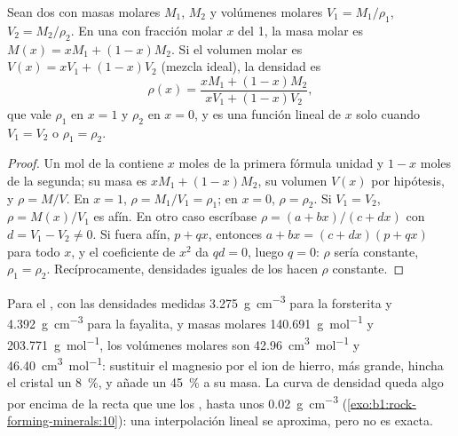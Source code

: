 \begin{proposition}\label{prop:b1:rock-forming-minerals:ideal-mixing}
Sean dos  con masas molares $M_1$, $M_2$ y volúmenes molares $V_1 = M_1/\rho_1$,
$V_2 = M_2/\rho_2$. En una  con fracción molar $x$ del  1, la masa molar es
$M(x) = x M_1 + (1 - x) M_2$. Si el volumen molar es $V(x) = x V_1 + (1 - x) V_2$ (mezcla ideal), la
densidad es
\[
  \rho(x) = \frac{x M_1 + (1 - x) M_2}{x V_1 + (1 - x) V_2},
\]
que vale $\rho_1$ en $x = 1$ y $\rho_2$ en $x = 0$, y es una función lineal de $x$ solo cuando
$V_1 = V_2$ o $\rho_1 = \rho_2$.
\end{proposition}

\begin{proof}
Un mol de la  contiene $x$ moles de la primera fórmula unidad y $1 - x$ moles de la
segunda; su masa es $x M_1 + (1 - x) M_2$, su volumen $V(x)$ por hipótesis, y $\rho = M/V$. En $x = 1$,
$\rho = M_1/V_1 = \rho_1$; en $x = 0$, $\rho = \rho_2$. Si $V_1 = V_2$, $\rho = M(x)/V_1$ es afín. En otro caso
escríbase $\rho = (a + bx)/(c + dx)$ con $d = V_1 - V_2 \ne 0$. Si fuera afín, $p + qx$, entonces
$a + bx = (c + dx)(p + qx)$ para todo $x$, y el coeficiente de $x^2$ da $qd = 0$, luego $q = 0$: $\rho$
sería constante, $\rho_1 = \rho_2$. Recíprocamente, densidades iguales de los  hacen $\rho$ constante.
\end{proof}

Para el , con las densidades medidas \qty{3.275}{g.cm^{-3}} para la forsterita y \qty{4.392}{g.cm^{-3}}
para la fayalita, y masas molares \qty{140.691}{g.mol^{-1}} y \qty{203.771}{g.mol^{-1}}, los volúmenes molares son
\qty{42.96}{cm^3.mol^{-1}} y \qty{46.40}{cm^3.mol^{-1}}: sustituir el magnesio por el ion de hierro, más grande,
hincha el cristal un \qty{8}{\percent}, y añade un \qty{45}{\percent} a su masa. La curva de densidad queda algo
por encima de la recta que une los , hasta unos \qty{0.02}{g.cm^{-3}}
(\cref{exo:b1:rock-forming-minerals:10}): una interpolación lineal se aproxima, pero no es exacta.

